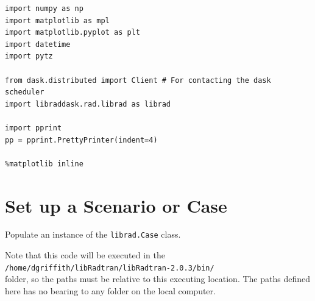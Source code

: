 \begin{lstlisting}[style=tinysize]
import numpy as np
import matplotlib as mpl
import matplotlib.pyplot as plt
import datetime
import pytz

from dask.distributed import Client # For contacting the dask scheduler
import libraddask.rad.librad as librad

import pprint
pp = pprint.PrettyPrinter(indent=4)

%matplotlib inline
\end{lstlisting}


\section{Set up a Scenario or Case}
\label{sec:SetupaScenarioorCase}

Populate an instance of the \verb+librad.Case+ class.


Note that this code will be executed in the\\
\verb+/home/dgriffith/libRadtran/libRadtran-2.0.3/bin/+\\
folder, so the paths must be relative to this executing location.  The paths defined here has no bearing to any folder on the local computer.



